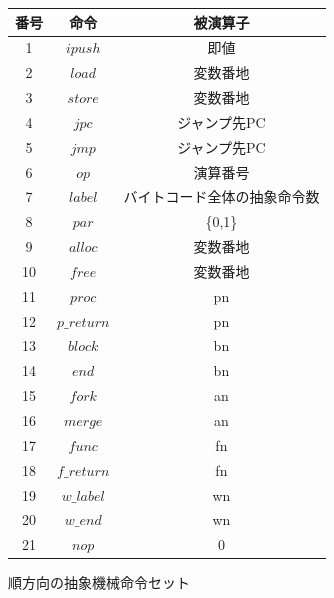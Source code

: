 \documentclass[submit,PRO]{ipsj}
\begin{document}
\begin{figure}[tb]
\caption{順方向の抽象機械命令セット}
\label{tab:forwardinstruction}
\begin{center}
\begin{tabular}[t]{|c|c|c|}\hline
番号 & 命令 & 被演算子 \\\hline
1 & $ipush$ & 即値 \\\hline
2 & $load$ & 変数番地 \\\hline
3 & $store$ &変数番地 \\\hline
4 & $jpc$&ジャンプ先PC \\\hline
5 & $jmp$&ジャンプ先PC \\\hline
6 & $op$&演算番号 \\\hline
7 & $label$&バイトコード全体の抽象命令数 \\\hline
8& $par$&\{0,1\} \\\hline
9& $alloc$&変数番地 \\\hline
10& $free$&変数番地 \\\hline
11& $proc$&pn \\\hline
12& $p\_return$&pn \\\hline
13& $block$ & bn \\\hline
14& $end$ & bn \\\hline
15& $fork$ & an \\\hline
16& $merge$ & an \\\hline
17& $func$ & fn \\\hline
18& $f\_return$ & fn \\\hline
19& $w\_label$ & wn \\\hline
20& $w\_end$ & wn \\\hline
21& $nop$ & 0 \\\hline
\end{tabular}
\end{center}
\end{figure}
\end{document}

